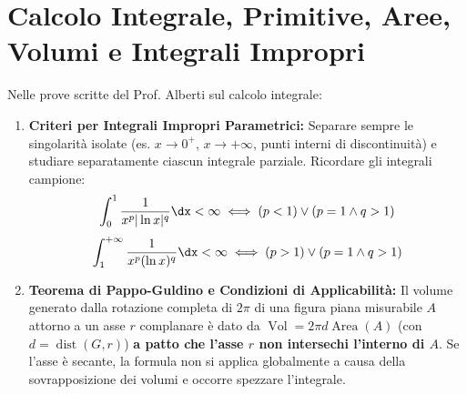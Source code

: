 \section{Calcolo Integrale, Primitive, Aree, Volumi e Integrali Impropri}
\label{sec:esami_integrali}

\begin{esame}
Nelle prove scritte del Prof. Alberti sul calcolo integrale:
\begin{enumerate}
    \item \textbf{Criteri per Integrali Impropri Parametrici:}
    Separare sempre le singolarità isolate (es. $x \to 0^+$, $x \to +\infty$, punti interni di discontinuità) e studiare separatamente ciascun integrale parziale.
    Ricordare gli integrali campione:
    \[
        \int_0^1 \frac{1}{x^p |\ln x|^q} \dx < \infty \iff (p < 1) \lor (p = 1 \land q > 1)
    \]
    \[
        \int_1^{+\infty} \frac{1}{x^p (\ln x)^q} \dx < \infty \iff (p > 1) \lor (p = 1 \land q > 1)
    \]
    \item \textbf{Teorema di Pappo-Guldino e Condizioni di Applicabilità:}
    Il volume generato dalla rotazione completa di $2\pi$ di una figura piana misurabile $A$ attorno a un asse $r$ complanare è dato da $\operatorname{Vol} = 2\pi d \operatorname{Area}(A)$ (con $d = \operatorname{dist}(G, r)$) \textbf{a patto che l'asse $r$ non intersechi l'interno di $A$}. Se l'asse è secante, la formula non si applica globalmente a causa della sovrapposizione dei volumi e occorre spezzare l'integrale.
\end{enumerate}
\end{esame}


